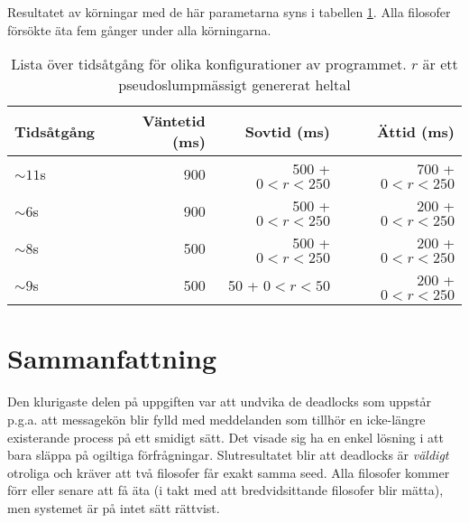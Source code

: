 \documentclass[a4paper, 11pt]{article}
\begin{document}
Resultatet av körningar med de här parametarna syns i tabellen \ref{tab:timer}. Alla filosofer försökte äta fem gånger under alla körningarna.

\begin{table}[h]
\centering
\begin{tabular}{|l|r|r|r|}  
\hline
Tidsåtgång & Väntetid (ms) & Sovtid (ms) & Ättid (ms)\\
\hline
$\sim11$s & 900 & 500 + $0 < r < 250$ & 700 + $0 < r < 250$\\
\hline
$\sim6$s & 900 & 500 + $0 < r < 250$ & 200 + $0 < r < 250$\\
\hline
$\sim8$s & 500 & 500 + $0 < r < 250$ & 200 + $0 < r < 250$\\
\hline
$\sim9$s & 500 & 50 + $0 < r < 50$ & 200 + $0 < r < 250$\\
\hline
\end{tabular}
\caption{Lista över tidsåtgång för olika konfigurationer av programmet. $r$ är ett pseudoslumpmässigt genererat heltal}
\label{tab:timer}
\end{table}

\section{Sammanfattning}
Den klurigaste delen på uppgiften var att undvika de deadlocks som uppstår p.g.a. att messagekön blir fylld med meddelanden som tillhör en icke-längre existerande process på ett smidigt sätt. Det visade sig ha en enkel lösning i att bara släppa på ogiltiga förfrågningar. Slutresultatet blir att deadlocks är \textit{väldigt} otroliga och kräver att två filosofer får exakt samma seed. Alla filosofer kommer förr eller senare att få äta (i takt med att bredvidsittande filosofer blir mätta), men systemet är på intet sätt rättvist.
\end{document}
